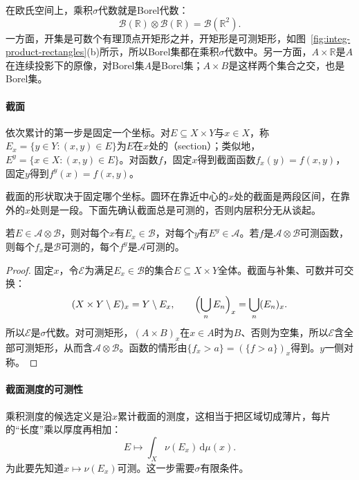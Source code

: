 在欧氏空间上，乘积$\sigma$代数就是Borel代数：
\begin{equation}
 \mathcal B(\mathbb R)\otimes\mathcal B(\mathbb R)=\mathcal B(\mathbb R^2).
 \label{eq:integ-borel-product}
\end{equation}
一方面，开集是可数个有理顶点开矩形之并，开矩形是可测矩形，如图~\ref{fig:integ-product-rectangles}(b)所示，所以Borel集都在乘积$\sigma$代数中。另一方面，$A\times\mathbb R$是$A$在连续投影下的原像，对Borel集$A$是Borel集；$A\times B$是这样两个集合之交，也是Borel集。

\paragraph{截面}
依次累计的第一步是固定一个坐标。对$E\subseteq X\times Y$与$x\in X$，称$E_x=\{y\in Y:(x,y)\in E\}$为$E$在$x$处的（section）；类似地，$E^y=\{x\in X:(x,y)\in E\}$。对函数$f$，固定$x$得到截面函数$f_x(y)=f(x,y)$，固定$y$得到$f^y(x)=f(x,y)$。

截面的形状取决于固定哪个坐标。圆环在靠近中心的$x$处的截面是两段区间，在靠外的$x$处则是一段。下面先确认截面总是可测的，否则内层积分无从谈起。

\begin{lemma}[截面的可测性]
\label{lem:integ-section-measurable}
若$E\in\mathcal A\otimes\mathcal B$，则对每个$x$有$E_x\in\mathcal B$，对每个$y$有$E^y\in\mathcal A$。若$f$是$\mathcal A\otimes\mathcal B$可测函数，则每个$f_x$是$\mathcal B$可测的，每个$f^y$是$\mathcal A$可测的。
\end{lemma}

\begin{proof}
固定$x$，令$\mathcal E$为满足$E_x\in\mathcal B$的集合$E\subseteq X\times Y$全体。截面与补集、可数并可交换：
\[
 (X\times Y\setminus E)_x=Y\setminus E_x,\qquad\Bigl(\bigcup_nE_n\Bigr)_x=\bigcup_n(E_n)_x .
\]
所以$\mathcal E$是$\sigma$代数。对可测矩形，$(A\times B)_x$在$x\in A$时为$B$、否则为空集，所以$\mathcal E$含全部可测矩形，从而含$\mathcal A\otimes\mathcal B$。函数的情形由$\{f_x>a\}=(\{f>a\})_x$得到。$y$一侧对称。
\end{proof}

\paragraph{截面测度的可测性}
乘积测度的候选定义是沿$x$累计截面的测度，这相当于把区域切成薄片，每片的“长度”乘以厚度再相加：
\[
 E\mapsto\int_X\nu(E_x)\,\mathrm d\mu(x).
\]
为此要先知道$x\mapsto\nu(E_x)$可测。这一步需要$\sigma$有限条件。

